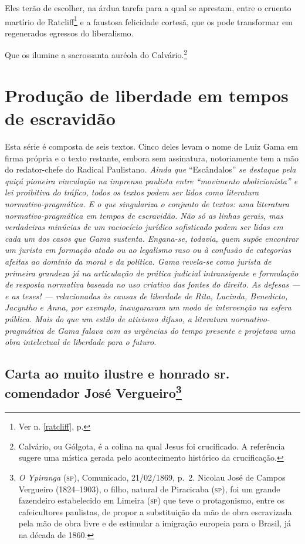 Eles terão de escolher, na árdua tarefa para a qual se aprestam, entre o
cruento martírio de Ratcliff\footnote{Ver n. \ref{ratcliff}, p. \pageref{ratcliff}} 
e a faustosa felicidade cortesã, que os pode transformar em regenerados 
egressos do liberalismo.

Que os ilumine a sacrossanta auréola do Calvário.\footnote{Calvário,
  ou Gólgota, é a colina na qual Jesus foi crucificado. A referência
  sugere uma mística gerada pelo acontecimento histórico da
  crucificação.}

\part{Produção de liberdade em tempos de escravidão} %

\begin{argumento}
Esta série é composta de seis textos. Cinco deles levam o nome de Luiz
Gama em firma própria e o texto restante, embora sem assinatura,
notoriamente tem a mão do redator-chefe do Radical Paulistano\emph{.
Ainda que} ``Escândalos'' \emph{se destaque pela quiçá pioneira vinculação
na imprensa paulista entre ``movimento abolicionista'' e lei proibitiva do
tráfico, todos os textos podem ser lidos como literatura
normativo-pragmática. E o que singulariza o conjunto de textos: uma
literatura normativo-pragmática em tempos de escravidão. Não só as
linhas gerais, mas verdadeiras minúcias de um raciocício jurídico
sofisticado podem ser lidas em cada um dos casos que Gama sustenta.
Engana-se, todavia, quem supõe encontrar um jurista em formação atado ou
ao legalismo raso ou à confusão de categorias afeitas ao domínio da
moral e da política. Gama revela-se como jurista de primeira grandeza já
na articulação de prática judicial intransigente e formulação de
resposta normativa baseada no uso criativo das fontes do direito. As
defesas --- e as teses! --- relacionadas às causas de liberdade de Rita,
Lucinda, Benedicto, Jacyntho e Anna, por exemplo, inauguravam um modo de
intervenção na esfera pública. Mais do que um estilo de ativismo difuso,
a literatura normativo-pragmática de Gama falava com as urgências do
tempo presente e projetava uma obra intelectual de liberdade para o
futuro.}
\end{argumento}

\chapter{Carta ao muito ilustre e honrado sr.\,comendador José
Vergueiro\footnote{\emph{O Ypiranga} (\textsc{sp}), Comunicado, 21/02/1869,
  p.~2. Nicolau José de Campos Vergueiro (1824--1903), o filho, natural
  de Piracicaba (\textsc{sp}), foi um grande fazendeiro estabelecido em Limeira
  (\textsc{sp}) que teve o protagonismo, entre os cafeicultores paulistas, de
  propor a substituição da mão de obra escravizada pela mão de obra
  livre e de estimular a imigração europeia para o Brasil, já na década
  de 1860.}}

